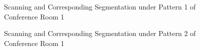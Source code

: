 \documentclass[11pt, a4paper,oneside,chapterprefix=false]{scrbook}
\begin{document}
\begin{figure}[H]
    \centering
      \label{fig:conf1 0 occluded} \hfill
     \label{fig:conf1 0 seg}
    \caption{Scanning and Corresponding Segmentation under Pattern 1 of Conference Room 1}
    \label{fig:conf1 0 occ and seg}
\end{figure}

\begin{figure}[H]
    \centering
      \label{fig:conf1 1 occluded} \hfill
     \label{fig:conf1 1 seg}
    \caption{Scanning and Corresponding Segmentation under Pattern 2 of Conference Room 1}
    \label{fig:conf1 1 occ and seg}
\end{figure}
\end{document}
